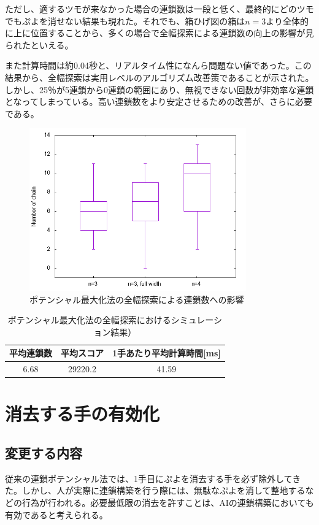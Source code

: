 \documentclass[12pt]{jarticle}
\begin{document}
ただし、適するツモが来なかった場合の連鎖数は一段と低く、最終的にどのツモでもぷよを消せない結果も現れた。それでも、箱ひげ図の箱は$n=3$より全体的に上に位置することから、多くの場合で全幅探索による連鎖数の向上の影響が見られたといえる。

また計算時間は約0.04秒と、リアルタイム性になんら問題ない値であった。この結果から、全幅探索は実用レベルのアルゴリズム改善策であることが示された。しかし、25％が5連鎖から0連鎖の範囲にあり、無視できない回数が非効率な連鎖となってしまっている。高い連鎖数をより安定させるための改善が、さらに必要である。

\begin{figure}[hbt]
  \begin{center}
  \includegraphics[height=7cm]{experiment/Potential/KAI/graph/chain_full.png}
  \caption{ポテンシャル最大化法の全幅探索による連鎖数への影響} \label{fig:poten_chain_width}
\end{center}
\end{figure}


\begin{table}[htb]
\begin{center}
\caption{ポテンシャル最大化法の全幅探索におけるシミュレーション結果）} \label{tab:poten_width}
\begin{tabular}{|c|c|c|} \hline
 平均連鎖数 & 平均スコア & 1手あたり平均計算時間[ms]\\ \hline
6.68 & 29220.2 & 41.59\\ \hline
\end{tabular}
\end{center}
\end{table}


\section{消去する手の有効化}
\subsection{変更する内容}
従来の連鎖ポテンシャル法では、1手目にぷよを消去する手を必ず除外してきた。しかし、人が実際に連鎖構築を行う際には、無駄なぷよを消して整地するなどの行為が行われる。必要最低限の消去を許すことは、AIの連鎖構築においても有効であると考えられる。
\end{document}

